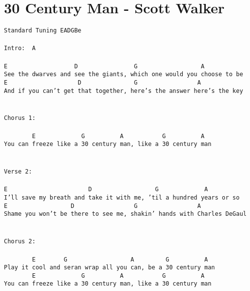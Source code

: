 \newpage
\section{30 Century Man - Scott Walker}
\label{30 Century Man - Scott Walker}
\texttt{Standard\ Tuning\ EADGBe\ \\
\\
Intro:\ \ A\\
\\
E\ \ \ \ \ \ \ \ \ \ \ \ \ \ \ \ \ \ \ D\ \ \ \ \ \ \ \ \ \ \ \ \ \ \ \ G\ \ \ \ \ \ \ \ \ \ \ \ \ \ \ \ \ \ A\\
See\ the\ dwarves\ and\ see\ the\ giants,\ which\ one\ would\ you\ choose\ to\ be\\
E\ \ \ \ \ \ \ \ \ \ \ \ \ \ \ \ \ \ \ \ D\ \ \ \ \ \ \ \ \ \ \ \ \ \ \ G\ \ \ \ \ \ \ \ \ \ \ \ \ \ \ \ \ A\ \\
And\ if\ you\ can't\ get\ that\ together,\ here's\ the\ answer\ here's\ the\ key\\
\\
\\
Chorus\ 1:\\
\\
\ \ \ \ \ \ \ \ E\ \ \ \ \ \ \ \ \ \ \ \ \ G\ \ \ \ \ \ \ \ \ \ A\ \ \ \ \ \ \ \ \ \ \ G\ \ \ \ \ \ \ \ \ \ A\ \ \ \\
You\ can\ freeze\ like\ a\ 30\ century\ man,\ like\ a\ 30\ century\ man\\
\\
\\
Verse\ 2:\\
\\
E\ \ \ \ \ \ \ \ \ \ \ \ \ \ \ \ \ \ \ \ \ \ \ D\ \ \ \ \ \ \ \ \ \ \ \ \ \ \ \ \ \ G\ \ \ \ \ \ \ \ \ \ \ \ \ A\\
I'll\ save\ my\ breath\ and\ take\ it\ with\ me,\ 'til\ a\ hundred\ years\ or\ so\\
E\ \ \ \ \ \ \ \ \ \ \ \ \ \ \ \ \ \ D\ \ \ \ \ \ \ \ \ \ \ \ \ \ \ \ \ G\ \ \ \ \ \ \ \ \ \ \ \ \ \ \ \ \ A\\
Shame\ you\ won't\ be\ there\ to\ see\ me,\ shakin'\ hands\ with\ Charles\ DeGaul\\
\\
\\
Chorus\ 2:\\
\\
\ \ \ \ \ \ \ \ E\ \ \ \ \ \ \ \ G\ \ \ \ \ \ \ \ \ \ \ \ \ \ \ \ \ \ A\ \ \ \ \ \ \ \ \ G\ \ \ \ \ \ \ \ \ \ A\\
Play\ it\ cool\ and\ seran\ wrap\ all\ you\ can,\ be\ a\ 30\ century\ man\\
\ \ \ \ \ \ \ \ E\ \ \ \ \ \ \ \ \ \ \ \ \ G\ \ \ \ \ \ \ \ \ \ A\ \ \ \ \ \ \ \ \ \ \ G\ \ \ \ \ \ \ \ \ \ A\\
You\ can\ freeze\ like\ a\ 30\ century\ man,\ like\ a\ 30\ century\ man\\}
